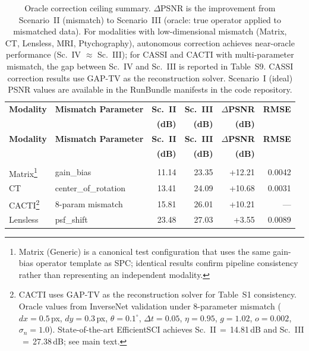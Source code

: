 \documentclass[11pt]{article}
\theoremstyle{definition}
\begin{document}
\begin{longtable}{>{\raggedright}p{2.0cm} >{\raggedright}p{2.8cm}
                  r r r r}
\caption{Oracle correction ceiling summary.  $\Delta$PSNR is the
improvement from Scenario~II (mismatch) to Scenario~III (oracle: true operator applied to mismatched data).
For modalities with low-dimensional mismatch (Matrix, CT, Lensless, MRI, Ptychography), autonomous correction achieves near-oracle performance (Sc.~IV $\approx$ Sc.~III); for CASSI and CACTI with multi-parameter mismatch, the gap between Sc.~IV and Sc.~III is reported in Table~S9. CASSI correction results use GAP-TV as the reconstruction solver.
Scenario~I (ideal) PSNR values are available in the RunBundle manifests in the code repository.}
\label{tab:correction_params} \\
\toprule
\textbf{Modality} & \textbf{Mismatch Parameter} &
  \textbf{Sc.~II} & \textbf{Sc.~III} &
  \textbf{$\Delta$PSNR} & \textbf{RMSE} \\
  & & \textbf{(dB)} & \textbf{(dB)} & \textbf{(dB)} & \\
\midrule
\endfirsthead
\toprule
\textbf{Modality} & \textbf{Mismatch Parameter} &
  \textbf{Sc.~II} & \textbf{Sc.~III} &
  \textbf{$\Delta$PSNR} & \textbf{RMSE} \\
  & & \textbf{(dB)} & \textbf{(dB)} & \textbf{(dB)} & \\
\midrule
\endhead
\midrule
\multicolumn{6}{r}{\emph{Continued on next page}} \\
\endfoot
\bottomrule
\endlastfoot
Matrix\footnote{Matrix (Generic) is a canonical test configuration that uses the same gain-bias operator template as SPC; identical results confirm pipeline consistency rather than representing an independent modality.}
  & gain\_bias
  & 11.14 & 23.35 & +12.21
  & 0.0042 \\
CT
  & center\_of\_rotation
  & 13.41 & 24.09 & +10.68
  & 0.0031 \\
CACTI\footnote{CACTI uses GAP-TV as the reconstruction solver for Table~S1 consistency.  Oracle values from InverseNet validation under 8-parameter mismatch ($dx{=}0.5$\,px, $dy{=}0.3$\,px, $\theta{=}0.1^\circ$, $\Delta t{=}0.05$, $\eta{=}0.95$, $g{=}1.02$, $o{=}0.002$, $\sigma_n{=}1.0$).  State-of-the-art EfficientSCI achieves Sc.~II$\,=\,$14.81\,dB and Sc.~III$\,=\,$27.38\,dB; see main text.}
  & 8-param mismatch
  & 15.81 & 26.01 & +10.21
  & --- \\
Lensless
  & psf\_shift
  & 23.48 & 27.03 & +3.55
  & 0.0089 \\

\end{longtable}
\end{document}
